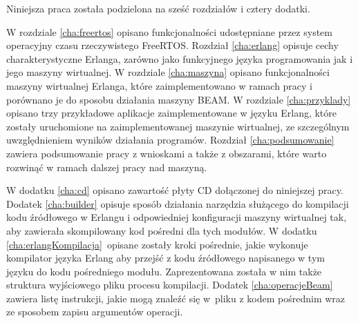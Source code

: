 Niniejsza praca została podzielona na sześć rozdziałów i cztery dodatki.

W rozdziale \ref{cha:freertos} opisano funkcjonalności udostępniane przez system operacyjny czasu rzeczywistego FreeRTOS.
Rozdział \ref{cha:erlang} opisuje cechy charakterystyczne Erlanga, zarówno jako funkcyjnego języka programowania jak i jego maszyny wirtualnej.
W rozdziale \ref{cha:maszyna} opisano funkcjonalności maszyny wirtualnej Erlanga, które zaimplementowano w ramach pracy i porównano je do sposobu działania maszyny BEAM.
W rozdziale \ref{cha:przyklady} opisano trzy przykładowe aplikacje zaimplementowane w języku Erlang, które zostały uruchomione na zaimplementowanej maszynie wirtualnej, ze szczególnym uwzględnieniem wyników działania programów.
Rozdział \ref{cha:podsumowanie} zawiera podsumowanie pracy z wnioskami a także z obszarami, które warto rozwinąć w ramach dalszej pracy nad maszyną.

W dodatku \ref{cha:cd} opisano zawartość płyty CD dołączonej do niniejszej pracy.
Dodatek \ref{cha:builder} opisuje sposób działania narzędzia służącego do kompilacji kodu źródłowego w Erlangu i odpowiedniej konfiguracji maszyny wirtualnej tak, aby zawierała skompilowany kod pośredni dla tych modułów.
W dodatku \ref{cha:erlangKompilacja}~opisane zostały kroki pośrednie, jakie wykonuje kompilator języka Erlang aby przejść z kodu źródłowego napisanego w tym języku do kodu pośredniego modułu. Zaprezentowana została w nim także struktura wyjściowego pliku procesu kompilacji.
Dodatek \ref{cha:operacjeBeam} zawiera listę instrukcji, jakie mogą znaleźć się w~pliku z kodem pośrednim wraz ze sposobem zapisu argumentów operacji.

